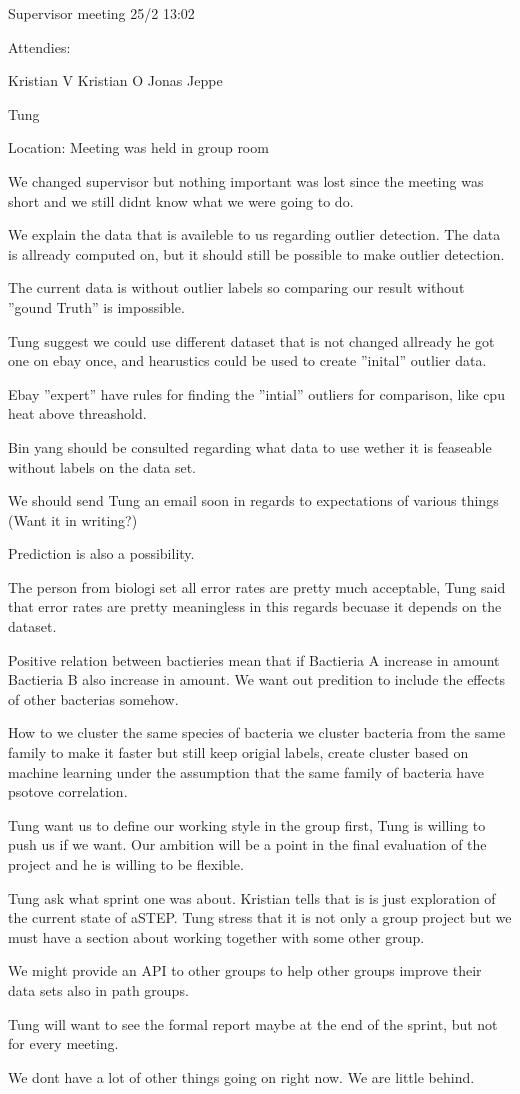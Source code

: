 Supervisor meeting 25/2 13:02

Attendies:

Kristian V
Kristian O
Jonas
Jeppe

Tung

Location: Meeting was held in group room

We changed supervisor but nothing important was lost since the meeting was short and we still didnt know what we were going to do.

We explain the data that is availeble to us regarding outlier detection.
The data is allready computed on, but it should still be possible to make outlier detection.

The current data is without outlier labels so comparing our result without ”gound Truth” is impossible.

Tung suggest we could use different dataset that is not changed allready he got one on ebay once, and hearustics could be used to create ”inital” outlier data. 

Ebay ”expert” have rules for finding the ”intial” outliers for comparison, like cpu heat above threashold. 

Bin yang should be consulted regarding what data to use wether it is feaseable without labels on the data set. 

We should send Tung an email soon in regards to expectations of various things (Want it in writing?)

Prediction is also a possibility.

The person from biologi set all error rates are pretty much acceptable, Tung said that error rates are pretty meaningless in this regards becuase it depends on the dataset.


Positive relation between bactieries mean that if Bactieria A increase in amount Bactieria B also increase in amount. We want out predition to include the effects of other bacterias somehow. 

How to we cluster the same species of bacteria we cluster bacteria from the same family to make it faster but still keep origial labels, create cluster based on machine learning under the assumption that the same family of bacteria have psotove correlation.

Tung want us to define our working style in the group first, Tung is willing to push us if we want. 
Our ambition will be a point in the final evaluation of the project and he is willing to be flexible.

Tung ask what sprint one was about. Kristian tells that is is just exploration of the current state of aSTEP. Tung stress that it is not only a group project but we must have a section about working together with some other group. 

We might provide an API to other groups to help other groups improve their data sets also in path groups. 

Tung will want to see the formal report maybe at the end of the sprint, but not for every meeting.

We dont have a lot of other things going on right now. We are little behind.